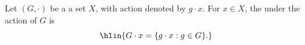 \begin{definition}[Orbit] \label{definition:orbit_of_a_group_action}
Let $(G,\cdot)$ be a   a set $X$, with action denoted by $g \cdot x$. For $x \in X$, the  under the action of $G$ is
$$\hlin{G \cdot x = \{ g \cdot x : g \in G \}.}$$
\end{definition}
